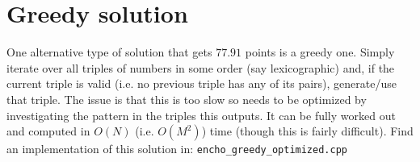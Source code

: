\documentclass{article}
\begin{document}
\section{Greedy solution}

One alternative type of solution that gets $77.91$ points is a greedy one. Simply iterate over all triples of numbers in some order (say lexicographic) and, if the current triple is valid (i.e. no previous triple has any of its pairs), generate/use that triple. The issue is that this is too slow so needs to be optimized by investigating the pattern in the triples this outputs. It can be fully worked out and computed in $O(N)$ (i.e. $O(M^2)$) time (though this is fairly difficult). Find an implementation of this solution in: \verb|encho_greedy_optimized.cpp|
\end{document}
